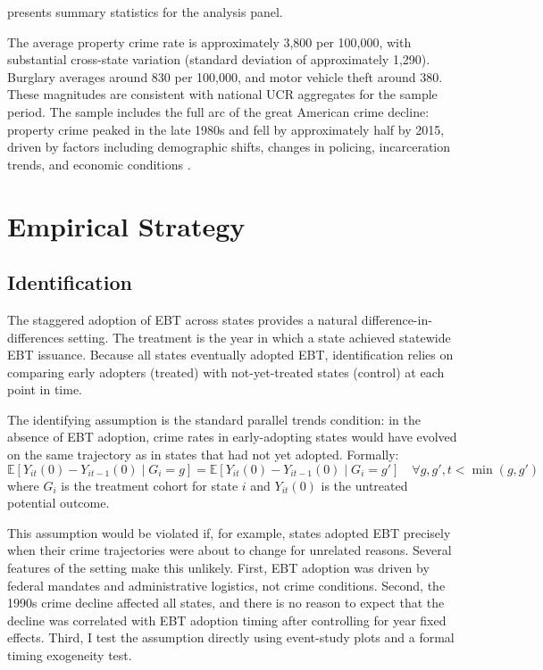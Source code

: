\documentclass[12pt]{article}
\newcommand{\E}{\mathbb{E}}
\begin{document}
 presents summary statistics for the analysis panel.



The average property crime rate is approximately 3,800 per 100,000, with substantial cross-state variation (standard deviation of approximately 1,290). Burglary averages around 830 per 100,000, and motor vehicle theft around 380. These magnitudes are consistent with national UCR aggregates for the sample period. The sample includes the full arc of the great American crime decline: property crime peaked in the late 1980s and fell by approximately half by 2015, driven by factors including demographic shifts, changes in policing, incarceration trends, and economic conditions \citep{levitt2004understanding, zimring2008great}.


\section{Empirical Strategy} \label{sec:strategy}

\subsection{Identification}

The staggered adoption of EBT across states provides a natural difference-in-differences setting. The treatment is the year in which a state achieved statewide EBT issuance. Because all states eventually adopted EBT, identification relies on comparing early adopters (treated) with not-yet-treated states (control) at each point in time.

The identifying assumption is the standard parallel trends condition: in the absence of EBT adoption, crime rates in early-adopting states would have evolved on the same trajectory as in states that had not yet adopted. Formally:
\begin{equation}
\E[Y_{it}(0) - Y_{it-1}(0) \mid G_i = g] = \E[Y_{it}(0) - Y_{it-1}(0) \mid G_i = g'] \quad \forall g, g', t < \min(g, g')
\end{equation}
where $G_i$ is the treatment cohort for state $i$ and $Y_{it}(0)$ is the untreated potential outcome.

This assumption would be violated if, for example, states adopted EBT precisely when their crime trajectories were about to change for unrelated reasons. Several features of the setting make this unlikely. First, EBT adoption was driven by federal mandates and administrative logistics, not crime conditions. Second, the 1990s crime decline affected all states, and there is no reason to expect that the decline was correlated with EBT adoption timing after controlling for year fixed effects. Third, I test the assumption directly using event-study plots and a formal timing exogeneity test.
\end{document}
